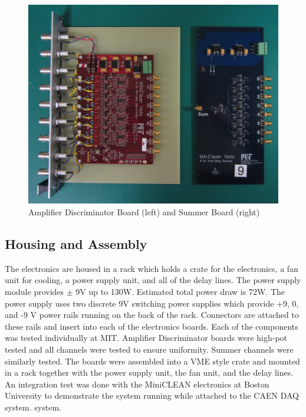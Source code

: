 \documentclass{JINST}
\begin{document}
\begin{figure}[ht]
\begin{center}
\includegraphics[width=5in, keepaspectratio=true]{graphics/boards.JPG}
\caption{Amplifier Discriminator Board (left) and Summer Board (right)
\label{fig:boards}}
\end{center}
\end{figure}

\subsection{Housing and Assembly}
\label{sec:Housing}
%
The electronics are housed in a rack which holds a crate for the
electronics, a fan unit for cooling, a power supply unit, and all of
the delay lines.  The power supply module provides $\pm$ 9V up to
130W.  Estimated total power draw is 72W.  The power supply uses two
discrete 9V switching power supplies which provide +9, 0, and -9 V
power rails running on the back of the rack.  Connectors are attached
to these rails and insert into each of the electronics boards.  Each
of the components was tested individually at MIT.  Amplifier
Discriminator boards were high-pot tested and all channels were tested
to ensure uniformity.  Summer channels were similarly tested.  The
boards were assembled into a VME style crate and mounted in a rack
together with the power supply unit, the fan unit, and the delay
lines.  An integration test was done with the MiniCLEAN electronics
at Boston University to
demonstrate the system running while attached to the CAEN DAQ system.
system.
\end{document}
